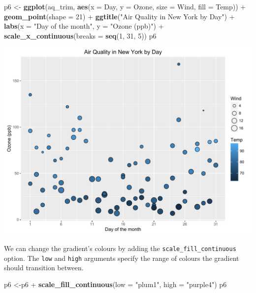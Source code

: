 \documentclass[]{article}
\newenvironment{Shaded}{\begin{snugshade}}{\end{snugshade}}
\newcommand{\KeywordTok}[1]{\textcolor[rgb]{0.13,0.29,0.53}{\textbf{{#1}}}}
\newcommand{\DataTypeTok}[1]{\textcolor[rgb]{0.13,0.29,0.53}{{#1}}}
\newcommand{\DecValTok}[1]{\textcolor[rgb]{0.00,0.00,0.81}{{#1}}}
\newcommand{\StringTok}[1]{\textcolor[rgb]{0.31,0.60,0.02}{{#1}}}
\newcommand{\NormalTok}[1]{{#1}}
\begin{document}
\begin{Shaded}
\begin{Highlighting}[]
\NormalTok{p6 <-}\StringTok{ }\KeywordTok{ggplot}\NormalTok{(aq_trim, }\KeywordTok{aes}\NormalTok{(}\DataTypeTok{x =} \NormalTok{Day, }\DataTypeTok{y =} \NormalTok{Ozone, }\DataTypeTok{size =} \NormalTok{Wind, }\DataTypeTok{fill =} \NormalTok{Temp)) +}\StringTok{ }
\StringTok{      }\KeywordTok{geom_point}\NormalTok{(}\DataTypeTok{shape =} \DecValTok{21}\NormalTok{) +}
\StringTok{      }\KeywordTok{ggtitle}\NormalTok{(}\StringTok{"Air Quality in New York by Day"}\NormalTok{) +}\StringTok{ }
\StringTok{      }\KeywordTok{labs}\NormalTok{(}\DataTypeTok{x =} \StringTok{"Day of the month"}\NormalTok{, }\DataTypeTok{y =} \StringTok{"Ozone (ppb)"}\NormalTok{) +}
\StringTok{      }\KeywordTok{scale_x_continuous}\NormalTok{(}\DataTypeTok{breaks =} \KeywordTok{seq}\NormalTok{(}\DecValTok{1}\NormalTok{, }\DecValTok{31}\NormalTok{, }\DecValTok{5}\NormalTok{))}
\NormalTok{p6}
\end{Highlighting}
\end{Shaded}

\begin{center}\includegraphics{0_all_posts_pdf/wscatter_8-1} \end{center}

We can change the gradient's colours by adding the
\texttt{scale\_fill\_continuous} option. The \texttt{low} and
\texttt{high} arguments specify the range of colours the gradient should
transition between.

\begin{Shaded}
\begin{Highlighting}[]
\NormalTok{p6 <-p6 +}\StringTok{ }\KeywordTok{scale_fill_continuous}\NormalTok{(}\DataTypeTok{low =} \StringTok{"plum1"}\NormalTok{, }\DataTypeTok{high =} \StringTok{"purple4"}\NormalTok{)}
\NormalTok{p6}
\end{Highlighting}
\end{Shaded}
\end{document}
